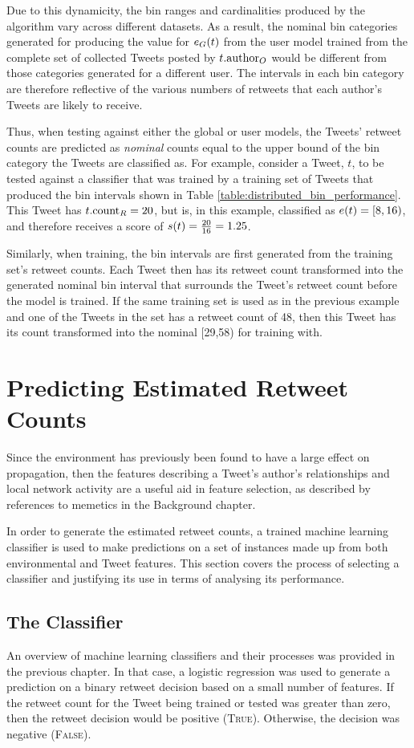 Due to this dynamicity, the bin ranges and cardinalities produced by the algorithm vary across different datasets. As a result, the nominal bin categories generated for producing the value for $e_G(t)$ from the user model trained from the complete set of collected Tweets posted by $t.\textrm{author}_O$ would be different from those categories generated for a different user. The intervals in each bin category are therefore reflective of the various numbers of retweets that each author's Tweets are likely to receive. 

Thus, when testing against either the global or user models, the Tweets' retweet counts are predicted as \textit{nominal} counts equal to the upper bound of the bin category the Tweets are classified as. For example, consider a Tweet, $t$, to be tested against a classifier that was trained by a training set of Tweets that produced the bin intervals shown in Table \ref{table:distributed_bin_performance}. This Tweet has $t.\textrm{count}_R = 20$, but is, in this example, classified as $e(t) =  {[8,16)}$, and therefore receives a score of $s(t) = \frac{20}{16} = 1.25$.

Similarly, when training, the bin intervals are first generated from the training set's retweet counts. Each Tweet then has its retweet count transformed into the generated nominal bin interval that surrounds the Tweet's retweet count before the model is trained. If the same training set is used as in the previous example and one of the Tweets in the set has a retweet count of 48, then this Tweet has its count transformed into the nominal {[29,58)} for training with.
 

\section{Predicting Estimated Retweet Counts}
Since the environment has previously been found to have a large effect on propagation, then the features describing a Tweet's author's relationships and local network activity  are a useful aid in feature selection, as described by references to memetics in the Background chapter. 
 
In order to generate the estimated retweet counts, a trained machine learning classifier is used to make predictions on a set of instances made up from both environmental and Tweet features. This section covers the process of selecting a classifier and justifying its use in terms of analysing its performance.


\subsection{The Classifier}
An overview of machine learning classifiers and their processes was provided in the previous chapter. In that case, a logistic regression was used to generate a prediction on a binary retweet decision based on a small number of features. If the retweet count for the Tweet being trained or tested was greater than zero, then the retweet decision would be positive (\textsc{True}). Otherwise, the decision was negative (\textsc{False}).

